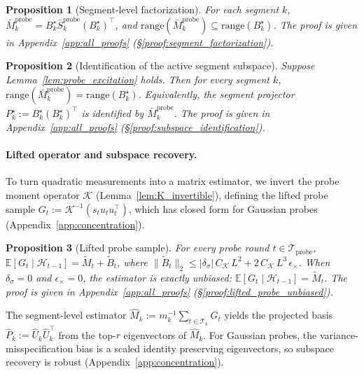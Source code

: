 \documentclass{article}
\newcommand{\E}{\mathbb{E}}
\newcommand{\cH}{\mathcal{H}}
\newcommand{\cT}{\mathcal{T}}
\newcommand{\cTprobe}{\mathcal{T}_{\mathrm{probe}}}
\newcommand{\range}{\mathrm{range}}
\newtheorem{proposition}{Proposition}
\begin{document}
\begin{proposition}[Segment-level factorization]
\label{prop:segment_factorization}
For each segment $k$, $\bar M_k^{\mathrm{probe}} = B_k^\star \bar S_k^{\mathrm{probe}} (B_k^\star)^\top$, and $\range(\bar M_k^{\mathrm{probe}})\subseteq \range(B_k^\star)$.
The proof is given in Appendix~\ref{app:all_proofs} (\S\ref{proof:segment_factorization}).
\end{proposition}



\begin{proposition}[Identification of the active segment subspace]
\label{prop:subspace_identification}
Suppose Lemma~\ref{lem:probe_excitation} holds.
Then for every segment $k$,
$\range(\bar M_k^{\mathrm{probe}}) = \range(B_k^\star)$.
Equivalently, the segment projector $P_k^\star := B_k^\star (B_k^\star)^\top$ is identified by $\bar M_k^{\mathrm{probe}}$.
The proof is given in Appendix~\ref{app:all_proofs} (\S\ref{proof:subspace_identification}).
\end{proposition}

\paragraph{Lifted operator and subspace recovery.} To turn quadratic measurements into a matrix estimator, we invert the probe moment operator $\mathcal{K}$ (Lemma~\ref{lem:K_invertible}), defining the lifted probe sample $G_t := \mathcal K^{-1}(s_t u_tu_t^\top)$, which has closed form for Gaussian probes (Appendix~\ref{app:concentration}).

\begin{proposition}[Lifted probe sample]
\label{prop:lifted_probe_unbiased}
For every probe round $t\in\cTprobe$,
$\E[G_t \mid \cH_{t-1}] = \widetilde M_t + \widetilde B_t$,
where $\|\widetilde B_t\|_2 \le |\delta_\sigma|\,C_{\mathcal K}\,L^2 + 2\,C_{\mathcal K}\,L^3\,\epsilon_\times$.
When $\delta_\sigma = 0$ and $\epsilon_\times = 0$, the estimator is exactly unbiased: $\E[G_t \mid \cH_{t-1}] = \widetilde M_t$.
The proof is given in Appendix~\ref{app:all_proofs} (\S\ref{proof:lifted_probe_unbiased}).
\end{proposition}

The segment-level estimator $\widehat M_k := m_k^{-1}\sum_{t\in\cT_k} G_t$ yields the projected basis $\widehat P_k := \widehat U_k \widehat U_k^\top$ from the top-$r$ eigenvectors of $\widehat M_k$. For Gaussian probes, the variance-misspecification bias is a scaled identity preserving eigenvectors, so subspace recovery is robust (Appendix~\ref{app:concentration}).
\end{document}

